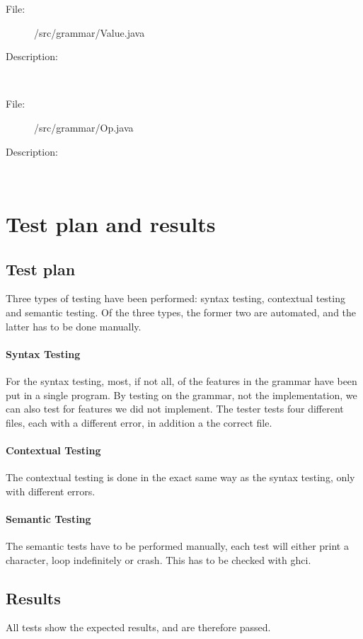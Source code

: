 \documentclass[10pt,a4paper]{report}
\begin{document}
\begin{description}
	\item[File:] /src/grammar/Value.java
	\item[Description:] \hfill \\
\end{description}

\begin{description}
	\item[File:] /src/grammar/Op.java
	\item[Description:] \hfill \\
\end{description}

\chapter{Test plan and results}

\section{Test plan}
Three types of testing have been performed: syntax testing, contextual testing and semantic testing. Of the three types, the former two are automated, and the latter has to be done manually.
\subsubsection*{Syntax Testing}
For the syntax testing, most, if not all, of the features in the grammar have been put in a single program. By testing on the grammar, not the implementation, we can also test for features we did not implement. The tester tests four different files, each with a different error, in addition a the correct file.
\subsubsection*{Contextual Testing}
The contextual testing is done in the exact same way as the syntax testing, only with different errors.
\subsubsection*{Semantic Testing}
The semantic tests have to be performed manually, each test will either print a character, loop indefinitely or crash. This has to be checked with ghci.

\section{Results}
All tests show the expected results, and are therefore passed.
\end{document}
